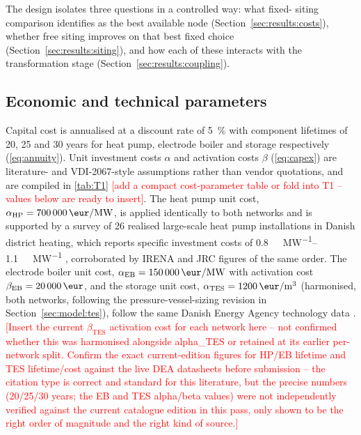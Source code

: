 \documentclass[review,3p]{elsarticle}
\newcommand{\placeholder}[1]{\textcolor{red}{[#1]}}
\begin{document}
The design isolates three questions in a controlled way: what fixed-
siting comparison identifies as the best available node
(Section~\ref{sec:results:costs}), whether free siting improves on that
best fixed choice (Section~\ref{sec:results:siting}), and how each of
these interacts with the transformation stage
(Section~\ref{sec:results:coupling}).

\subsection{Economic and technical parameters}
\label{sec:cases:parameters}

Capital cost is annualised at a discount rate of \SI{5}{\percent}
\cite{DEA.2024a} with
component lifetimes of \num{20}, \num{25} and \num{30} years for heat
pump, electrode boiler and storage respectively \cite{DEA.2024a,DEA.2024b}
(\cref{eq:annuity}).
Unit investment costs $\alpha$ and activation costs $\beta$
(\cref{eq:capex}) are literature- and VDI-2067-style assumptions rather
than vendor quotations, and are compiled in \cref{tab:T1}
\placeholder{add a compact cost-parameter table or fold into T1 -- values
below are ready to insert}. The
heat pump unit cost, $\alpha_{\mathrm{HP}} = \SI{700000}{\eur\per
\mega\watt}$, is applied identically to both networks and is supported
by a survey of 26 realised large-scale heat pump installations in Danish
district heating, which reports specific investment costs of
\SIrange{0.8}{1.1}{\mega\eur\per\mega\watt} \cite{Pieper.2018}, corroborated
by IRENA and JRC figures of the same order. The electrode boiler unit
cost, $\alpha_{\mathrm{EB}} = \SI{150000}{\eur\per\mega\watt}$ with
activation cost $\beta_{\mathrm{EB}} = \SI{20000}{\eur}$, and the storage
unit cost, $\alpha_{\mathrm{TES}} = \SI{1200}{\eur\per\cubic\metre}$
(harmonised, both networks, following the pressure-vessel-sizing
revision in Section~\ref{sec:model:tes}), follow the same Danish Energy
Agency technology data \cite{DEA.2024a,DEA.2024b}.
\placeholder{Insert the current $\beta_{\mathrm{TES}}$ activation cost
for each network here -- not confirmed whether this was harmonised
alongside alpha\_TES or retained at its earlier per-network split.
Confirm the exact current-edition figures for HP/EB
lifetime and TES lifetime/cost against the live DEA datasheets before
submission -- the citation type is correct and standard for this
literature, but the precise numbers (20/25/30 years; the EB and TES
alpha/beta values) were not independently verified against the current
catalogue edition in this pass, only shown to be the right order of
magnitude and the right kind of source.}
\end{document}
